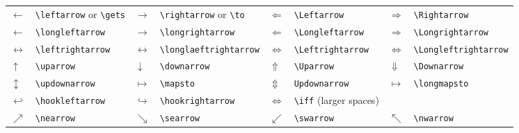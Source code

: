 \documentclass[10pt, english]{article}
\begin{document}
	\begin{center}
		\scriptsize
	\begin{tabular}{ll|ll|ll|ll}
		$\leftarrow$ & \verb|\leftarrow| or \verb|\gets| & $\rightarrow$ & \verb|\rightarrow| or \verb|\to| & $\Leftarrow$ & \verb|\Leftarrow| & $\Rightarrow$ & \verb|\Rightarrow| \\
		$\longleftarrow$ & \verb|\longleftarrow| & $\longrightarrow$ & \verb|\longrightarrow| & $\Longleftarrow$ & \verb|\Longleftarrow| & $\Longrightarrow$ & \verb|\Longrightarrow| \\
		$\leftrightarrow$ & \verb|\leftrightarrow| & $\longleftrightarrow$ & \verb|\longlaeftrightarrow| & $\Leftrightarrow$ & \verb|\Leftrightarrow| & $\Longleftrightarrow$ & \verb|\Longleftrightarrow| \\
		$\uparrow$ & \verb|\uparrow| & $\downarrow$ & \verb|\downarrow| & $\Uparrow$ & \verb|\Uparrow| & $\Downarrow$ & \verb|\Downarrow| \\
		$\updownarrow$ & \verb|\updownarrow| & $\mapsto$ & \verb|\mapsto| & $\Updownarrow$ & \verb|Updownarrow| & $\longmapsto$ & \verb|\longmapsto| \\
		$\hookleftarrow$ & \verb|\hookleftarrow| & $\hookrightarrow$ & \verb|\hookrightarrow| & $\iff$ & \verb|\iff| (larger spaces) \\ 
		$\nearrow$ & \verb|\nearrow| & $\searrow$ & \verb|\searrow| & $\swarrow$ & \verb|\swarrow| & $\nwarrow$ & \verb|\nwarrow| \\
	\end{tabular}
	\end{center}
\end{document}
